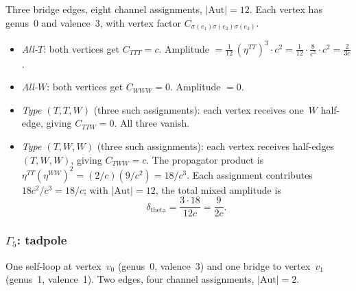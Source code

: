 \documentclass[11pt]{article}
\theoremstyle{plain}
\theoremstyle{definition}
\theoremstyle{remark}
\begin{document}
Three bridge edges, eight channel assignments, $|\mathrm{Aut}| = 12$.
Each vertex has genus~0 and valence~3, with vertex factor
$C_{\sigma(e_1)\sigma(e_2)\sigma(e_3)}$.
\begin{itemize}
\item \emph{All-$T$}: both vertices get $C_{TTT} = c$.
 Amplitude $= \frac{1}{12}\, (\eta^{TT})^3 \cdot c^2
 = \frac{1}{12} \cdot \frac{8}{c^3} \cdot c^2
 = \frac{2}{3c}$.

\item \emph{All-$W$}: both vertices get $C_{WWW} = 0$.
 Amplitude $= 0$.

\item \emph{Type $(T,T,W)$} (three such assignments):
 each vertex receives one~$W$ half-edge, giving $C_{TTW} = 0$.
 All three vanish.

\item \emph{Type $(T,W,W)$} (three such assignments):
 each vertex receives half-edges $(T,W,W)$, giving
 $C_{TWW} = c$. The propagator product is
 $\eta^{TT} (\eta^{WW})^2 = (2/c)(9/c^2) = 18/c^3$.
 Each assignment contributes $18c^2/c^3 = 18/c$; with
 $|\mathrm{Aut}| = 12$, the total mixed amplitude is
 \begin{equation}\label{eq:theta-mixed}
 \delta_{\mathrm{theta}} = \frac{3 \cdot 18}{12c}
 = \frac{9}{2c}.
 \end{equation}
\end{itemize}

\subsubsection*{$\Gamma_5$: tadpole}

One self-loop at vertex~$v_0$ (genus~0, valence~3) and one bridge
to vertex~$v_1$ (genus~1, valence~1). Two edges, four channel
assignments, $|\mathrm{Aut}| = 2$.
\end{document}
